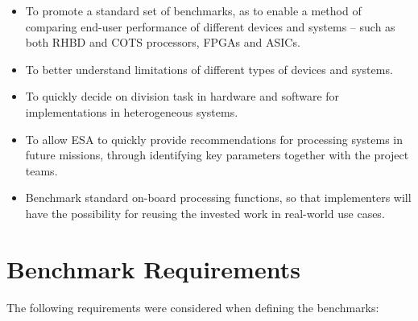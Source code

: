 \begin{itemize}
    \item To promote a standard set of benchmarks, as to enable a method of comparing end-user performance of different devices and systems – such as both RHBD and COTS processors, FPGAs and ASICs.
    \item To better understand limitations of different types of devices and systems.
    \item To quickly decide on division task in hardware and software for implementations in heterogeneous systems.
    \item To allow ESA to quickly provide recommendations for processing systems in future missions, through identifying key parameters together with the project teams.
    \item Benchmark standard on-board processing functions, so that implementers will have the possibility for reusing the invested work in real-world use cases.
\end{itemize}

\section{Benchmark Requirements}
The following requirements were considered when defining the benchmarks: 

